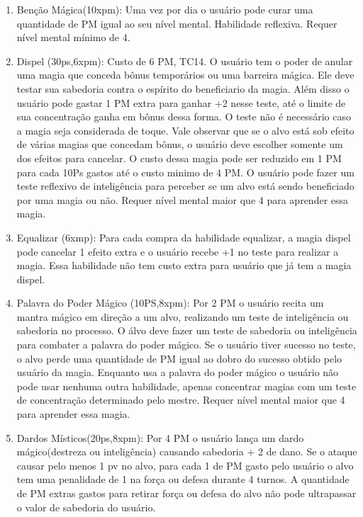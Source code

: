 \begin{enumerate}
		 	\item Benção Mágica(10xpm): Uma vez por dia o usuário pode curar uma quantidade de PM igual ao seu nível mental. Habilidade reflexiva. Requer nível mental mínimo de 4.
 
		
		 	\item Dispel (30ps,6xpm): Custo de 6 PM, TC14.\newline
O usuário tem o poder de anular uma magia que conceda bônus temporários ou uma barreira mágica. Ele deve testar sua sabedoria contra o espírito do beneficiario da magia. Além disso o usuário pode gastar 1 PM extra para ganhar +2 nesse teste, até o limite de sua concentração ganha em bônus dessa forma. O teste não é necessário caso a magia seja considerada de toque. Vale observar que se o alvo está sob efeito de várias magias que concedam bônus, o usuário deve escolher somente um dos efeitos para cancelar. O custo dessa magia pode ser reduzido em 1 PM para cada 10Ps gastos até o custo minimo de 4 PM. O usuário pode fazer um teste reflexivo de inteligência para perceber se um alvo está sendo beneficiado por uma magia ou não. Requer nível mental maior que 4 para aprender essa magia.

		 	\item Equalizar (6xmp): Para cada compra da habilidade equalizar, a magia dispel pode cancelar 1 efeito extra e o usuário recebe +1 no teste para realizar a magia. Essa habilidade não tem custo extra para usuário que já tem a magia dispel.

 	\item Palavra do Poder Mágico (10PS,8xpm): Por 2 PM o usuário recita um mantra mágico em direção a um alvo, realizando um teste de inteligência ou sabedoria no processo. O álvo deve fazer um teste de sabedoria ou inteligência para combater a palavra do poder mágico. Se o usuário tiver sucesso no teste, o alvo perde uma quantidade de PM igual ao dobro do sucesso obtido pelo usuário da magia. Enquanto usa a palavra do poder mágico o usuário não pode usar nenhuma outra habilidade, apenas concentrar magias com um teste de concentração determinado pelo mestre. Requer nível mental maior que 4 para aprender essa magia.

  	 	\item Dardos Místicos(20ps,8xpm): Por 4 PM o usuário lança um dardo mágico(destreza ou inteligência) causando sabedoria + 2 de dano. Se o ataque causar pelo menos 1 pv no alvo, para cada 1 de PM gasto pelo usuário o alvo tem uma penalidade de 1 na força ou defesa durante 4 turnos. A quantidade de PM extras gastos para retirar força ou defesa do alvo não pode ultrapassar o valor de sabedoria do usuário.
  

\end{enumerate}
